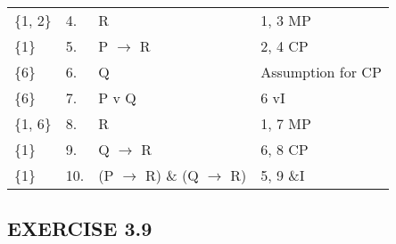 \documentclass[a4paper,12pt]{article}
\newcommand{\mra}{$\rightarrow$ }
\begin{document}
\begin{enumerate}[label=\arabic*,leftmargin=*]
\begin{enumerate}[label=\arabic*.]
\begin{minipage}{\textwidth}
\begin{tabular}{l l l l}
                        \{1, 2\} & 4. & R & 1, 3 MP\\
                        \{1\} & 5. & P \mra R & 2, 4 CP\\
                        \{6\} & 6. & Q & Assumption for CP\\
                        \{6\} & 7. & P v Q & 6 vI\\
                        \{1, 6\} & 8. & R & 1, 7 MP\\
                        \{1\} & 9. & Q \mra R & 6, 8 CP\\
                        \{1\} & 10. & (P \mra R) \& (Q \mra R) & 5, 9 \&I\\
                    \end{tabular}
                \end{minipage}

        \end{enumerate}
    \end{enumerate}

    \subsection*{EXERCISE 3.9}
\end{document}
